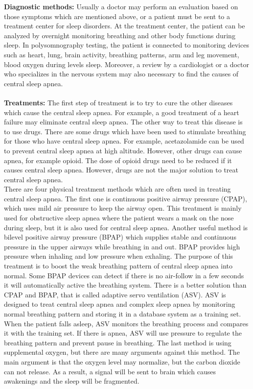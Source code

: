     \textbf{Diagnostic methods:} Usually a doctor may perform an evaluation based on those symptoms which are mentioned above, or a patient must be sent to a treatment center for sleep disorders. At the treatment center, the patient can be analyzed by overnight monitoring breathing and other body functions during sleep. In polysomnography testing, the patient is connected to monitoring devices such as heart, lung, brain activity, breathing patterns, arm and leg movement, blood oxygen during levels sleep. Moreover, a review by a cardiologist or a doctor who specializes in the nervous system may also necessary to find the causes of central sleep apnea.\\\\
    \textbf{Treatments:} The first step of treatment is to try to cure the other diseases which cause the central sleep apnea. For example, a good treatment of a heart failure may eliminate central sleep apnea. The other way to treat this disease is to use drugs. There are some drugs which have been used to stimulate breathing for those who have central sleep apnea. For example, acetazolamide can be used to prevent central sleep apnea at high altitude. However, other drugs can cause apnea, for example opioid. The dose of opioid drugs need to be reduced if it causes central sleep apnea. However, drugs are not the major solution to treat central sleep apnea. \\There are four physical treatment methods which are often used in treating central sleep apnea. The first one is continuous positive airway pressure (CPAP), which uses mild air pressure to keep the airway open. This treatment is mainly used for obstructive sleep apnea where the patient wears a mask on the nose during sleep, but it is also used for central sleep apnea. Another useful method is bilevel positive airway pressure (BPAP) which supplies stable and continuous pressure in the upper airways while breathing in and out. BPAP provides high pressure when inhaling and low pressure when exhaling. The purpose of this treatment is to boost the weak breathing pattern of central sleep apnea into normal. Some BPAP devices can detect if there is no air-follow in a few seconds it will automatically active the breathing system. There is a better solution than CPAP and BPAP, that is called adaptive servo ventilation (ASV). ASV is designed to treat central sleep apnea and complex sleep apnea by monitoring normal breathing pattern and storing it in a database system as a training set. When the patient falls asleep, ASV monitors the breathing process and compares it with the training set. If there is apnea, ASV will use pressure to regulate the breathing pattern and prevent pause in breathing. The last method is using supplemental oxygen, but there are many arguments against this method. The main argument is that the oxygen level may normalize, but the carbon dioxide can not release. As a result, a signal will be sent to brain which causes awakenings and the sleep will be fragmented.
